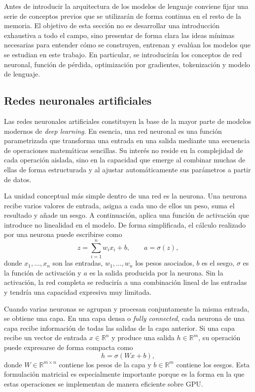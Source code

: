 \documentclass[11pt,a4paper]{article}
\begin{document}
Antes de introducir la arquitectura de los modelos de lenguaje conviene fijar una serie de conceptos previos que se utilizarán de forma continua en el resto de la memoria. El objetivo de esta sección no es desarrollar una introducción exhaustiva a todo el campo, sino presentar de forma clara las ideas mínimas necesarias para entender cómo se construyen, entrenan y evalúan los modelos que se estudian en este trabajo. En particular, se introducirán los conceptos de red neuronal, función de pérdida, optimización por gradientes, tokenización y modelo de lenguaje.

\subsection{Redes neuronales artificiales}

Las redes neuronales artificiales constituyen la base de la mayor parte de modelos modernos de \textit{deep learning}. En esencia, una red neuronal es una función parametrizada que transforma una entrada en una salida mediante una secuencia de operaciones matemáticas sencillas. Su interés no reside en la complejidad de cada operación aislada, sino en la capacidad que emerge al combinar muchas de ellas de forma estructurada y al ajustar automáticamente sus parámetros a partir de datos.

La unidad conceptual más simple dentro de una red es la neurona. Una neurona recibe varios valores de entrada, asigna a cada uno de ellos un peso, suma el resultado y añade un sesgo. A continuación, aplica una función de activación que introduce no linealidad en el modelo. De forma simplificada, el cálculo realizado por una neurona puede escribirse como
\[
z = \sum_{i=1}^{n} w_i x_i + b,
\qquad
a = \sigma(z),
\]
donde $x_1, \dots, x_n$ son las entradas, $w_1, \dots, w_n$ los pesos asociados, $b$ es el sesgo, $\sigma$ es la función de activación y $a$ es la salida producida por la neurona. Sin la activación, la red completa se reduciría a una combinación lineal de las entradas y tendría una capacidad expresiva muy limitada.

Cuando varias neuronas se agrupan y procesan conjuntamente la misma entrada, se obtiene una capa. En una capa densa o \textit{fully connected}, cada neurona de una capa recibe información de todas las salidas de la capa anterior. Si una capa recibe un vector de entrada $x \in \mathbb{R}^{n}$ y produce una salida $h \in \mathbb{R}^{m}$, su operación puede expresarse de forma compacta como
\[
h = \sigma(Wx + b),
\]
donde $W \in \mathbb{R}^{m \times n}$ contiene los pesos de la capa y $b \in \mathbb{R}^{m}$ contiene los sesgos. Esta formulación matricial es especialmente importante porque es la forma en la que estas operaciones se implementan de manera eficiente sobre GPU.
\end{document}
